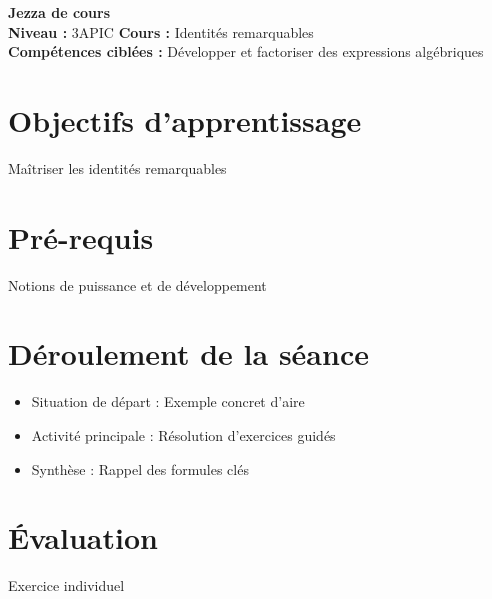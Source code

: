 \documentclass[12pt]{article}
\begin{document}
\begin{center}
    {\LARGE \textbf{Jezza de cours}} \\[1ex]
    \textbf{Niveau :} 3APIC \quad
    \textbf{Cours :} Identités remarquables \\[1ex]
    \textbf{Compétences ciblées :} Développer et factoriser des expressions algébriques
\end{center}

\vspace{1em}

\section*{Objectifs d'apprentissage}
Maîtriser les identités remarquables

\section*{Pré-requis}
Notions de puissance et de développement

\section*{Déroulement de la séance}
\begin{itemize}[label=\textbullet]
    \item Situation de départ : Exemple concret d'aire
    \item Activité principale : Résolution d'exercices guidés
    \item Synthèse : Rappel des formules clés
\end{itemize}

\section*{Évaluation}
Exercice individuel
\end{document}
